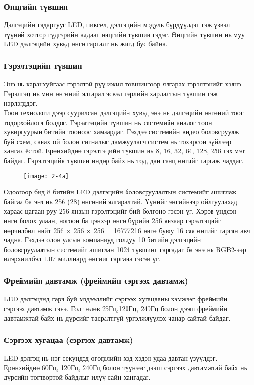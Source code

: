 \subsubsection{Өнцгийн түвшин}
Дэлгэцийн гадаргууг LED, пиксел, дэлгэцийн модуль бүрдүүлдэг гэж үзвэл түүний хотгор гүдгэрийн алдааг өнцгийн түвшин гэдэг. Өнцгийн түвшин нь муу LED дэлгэцийн хувьд өнгө гаргалт нь жигд бус байна.
\subsubsection{Гэрэлтэцийн түвшин}
Энэ нь харанхуйгаас гэрэлтэй рүү ижил төвшингөөр ялгарах гэрэлтэцийг хэлнэ. Гэрэлтэц нь мөн өнгөний ялгарал эсвэл гэрлийн харлалтын түвшин гэж нэрлэгддэг. \\
Тоон технологи дээр суурилсан дэлгэцийн хувьд энэ нь дэлгэцийн өнгөний тоог тодорхойлогч болдог. Гэрэлтэцийн түвшин нь системийн аналог тоон хувиргуурын битийн тооноос хамаардаг. Гэхдээ системийн видео боловсруулж буй схем, санах ой болон сигналыг дамжуулагч систем нь тохирсон зүйлээр хангах ёстой. Ерөнхийдөө гэрэлтэцийн түвшин нь 8, 16, 32, 64, 128, 256 гэх мэт байдаг. Гэрэлтэцийн түвшин өндөр байх нь тод, дан ганц өнгийг гаргаж чаддаг. \\
\begin{figure}[!ht]
	\centering
	\texttt{[image: 2-4a]}
	
\end{figure}
Одоогоор бид 8 битийн LED дэлгэцийн боловсруулалтын системийг ашиглаж байгаа ба энэ нь 256 (28) өнгөний ялгаралтай. Үүнийг энгийнээр ойлгуулахад хараас цагаан руу 256 янзын гэрэлтэцийг бий болгоно гэсэн үг. Хэрэв үндсэн өнгө болох улаан, ногоон ба цэнхэр өнгө бүрийн 256 янзаар гэрэлтэцийг өөрчилбөл нийт 256 × 256 × 256 = 16777216 өнгө буюу 16 сая өнгийг гарган авч чадна. Гэхдээ олон улсын компаниуд голдуу 10 битийн дэлгэцийн боловсруулалтын системийг ашиглан 1024 түвшинг гаргадаг ба энэ нь RGB2-ээр илэрхийлбэл 1.07 миллиард өнгийг гаргана гэсэн үг.
\subsubsection{Фреймийн давтамж (фреймийн сэргээх давтамж)}
LED дэлгэцэнд гарч буй мэдээллийг сэргээх хугацааны хэмжээг фреймийн сэргээх давтамж гэнэ.
Гол төлөв 25Гц,120Гц, 240Гц болон дээш фреймийн давтамжтай байх нь дүрсийг тасралтгүй үргэлжлүүлэх чанар сайтай байдаг.
\subsubsection{Сэргээх хугацаа (сэргээх давтамж)}
LED дэлгэц нь нэг секундэд өгөгдлийн хэд хэдэн удаа давтан үзүүлдэг.
Ерөнхийдөө 60Гц, 120Гц, 240Гц болон түүнээс дээш сэргээх давтамжтай байх нь дүрсийн тогтвортой байдлыг илүү сайн хангадаг.
